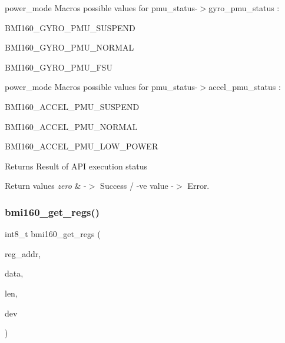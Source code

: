 power\+\_\+mode Macros possible values for pmu\+\_\+status-\/$>$gyro\+\_\+pmu\+\_\+status \+:
\begin{DoxyItemize}
\item B\+M\+I160\+\_\+\+G\+Y\+R\+O\+\_\+\+P\+M\+U\+\_\+\+S\+U\+S\+P\+E\+ND
\item B\+M\+I160\+\_\+\+G\+Y\+R\+O\+\_\+\+P\+M\+U\+\_\+\+N\+O\+R\+M\+AL
\item B\+M\+I160\+\_\+\+G\+Y\+R\+O\+\_\+\+P\+M\+U\+\_\+\+F\+SU
\end{DoxyItemize}

power\+\_\+mode Macros possible values for pmu\+\_\+status-\/$>$accel\+\_\+pmu\+\_\+status \+:
\begin{DoxyItemize}
\item B\+M\+I160\+\_\+\+A\+C\+C\+E\+L\+\_\+\+P\+M\+U\+\_\+\+S\+U\+S\+P\+E\+ND
\item B\+M\+I160\+\_\+\+A\+C\+C\+E\+L\+\_\+\+P\+M\+U\+\_\+\+N\+O\+R\+M\+AL
\item B\+M\+I160\+\_\+\+A\+C\+C\+E\+L\+\_\+\+P\+M\+U\+\_\+\+L\+O\+W\+\_\+\+P\+O\+W\+ER
\end{DoxyItemize}

\begin{DoxyReturn}{Returns}
Result of A\+PI execution status 
\end{DoxyReturn}

\begin{DoxyRetVals}{Return values}
{\em zero} & -\/$>$ Success / -\/ve value -\/$>$ Error. \\
\hline
\end{DoxyRetVals}
\mbox{\label{group__bmi160_ga9bebc4a575526f49e625a87de9478e04}} 
\subsubsection{\texorpdfstring{bmi160\+\_\+get\+\_\+regs()}{bmi160\_get\_regs()}}
{\footnotesize\ttfamily int8\+\_\+t bmi160\+\_\+get\+\_\+regs (\begin{DoxyParamCaption}\item[{uint8\+\_\+t}]{reg\+\_\+addr,  }\item[{uint8\+\_\+t $\ast$}]{data,  }\item[{uint16\+\_\+t}]{len,  }\item[{const struct \hyperlink{structbmi160__dev}{bmi160\+\_\+dev} $\ast$}]{dev }\end{DoxyParamCaption})}



